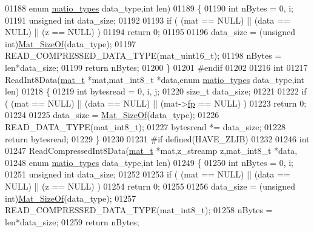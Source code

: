 \begin{DoxyCode}
01188     \textcolor{keyword}{enum} \hyperlink{group___m_a_t_gacf7b3b879282b7ab3a51190e49bf3453}{matio\_types} data\_type,\textcolor{keywordtype}{int} len)
01189 \{
01190     \textcolor{keywordtype}{int} nBytes = 0, i;
01191     \textcolor{keywordtype}{unsigned} \textcolor{keywordtype}{int} data\_size;
01192 
01193     \textcolor{keywordflow}{if} ( (mat == NULL) || (data == NULL) || (z == NULL) )
01194         \textcolor{keywordflow}{return} 0;
01195 
01196     data\_size = (\textcolor{keywordtype}{unsigned} int)\hyperlink{group__mat__util_gab6774aabdc124c540c1e7686d0804940}{Mat\_SizeOf}(data\_type);
01197     READ\_COMPRESSED\_DATA\_TYPE(mat\_uint16\_t);
01198     nBytes = len*data\_size;
01199     \textcolor{keywordflow}{return} nBytes;
01200 \}
01201 \textcolor{preprocessor}{#endif}
01202 
01216 \textcolor{keywordtype}{int}
01217 ReadInt8Data(\hyperlink{struct__mat__t}{mat\_t} *mat,mat\_int8\_t *data,\textcolor{keyword}{enum} \hyperlink{group___m_a_t_gacf7b3b879282b7ab3a51190e49bf3453}{matio\_types} data\_type,\textcolor{keywordtype}{int} len)
01218 \{
01219     \textcolor{keywordtype}{int} bytesread = 0, i, j;
01220     \textcolor{keywordtype}{size\_t} data\_size;
01221 
01222     \textcolor{keywordflow}{if} ( (mat == NULL) || (data == NULL) || (mat->\hyperlink{struct__mat__t_a85f562e407ca9ad4d2a6e14f839432b7}{fp} == NULL) )
01223         \textcolor{keywordflow}{return} 0;
01224 
01225     data\_size = \hyperlink{group__mat__util_gab6774aabdc124c540c1e7686d0804940}{Mat\_SizeOf}(data\_type);
01226     READ\_DATA\_TYPE(mat\_int8\_t);
01227     bytesread *= data\_size;
01228     \textcolor{keywordflow}{return} bytesread;
01229 \}
01230 
01231 \textcolor{preprocessor}{#if defined(HAVE\_ZLIB)}
01232 
01246 \textcolor{keywordtype}{int}
01247 ReadCompressedInt8Data(\hyperlink{struct__mat__t}{mat\_t} *mat,z\_streamp z,mat\_int8\_t *data,
01248     \textcolor{keyword}{enum} \hyperlink{group___m_a_t_gacf7b3b879282b7ab3a51190e49bf3453}{matio\_types} data\_type,\textcolor{keywordtype}{int} len)
01249 \{
01250     \textcolor{keywordtype}{int} nBytes = 0, i;
01251     \textcolor{keywordtype}{unsigned} \textcolor{keywordtype}{int} data\_size;
01252 
01253     \textcolor{keywordflow}{if} ( (mat == NULL) || (data == NULL) || (z == NULL) )
01254         \textcolor{keywordflow}{return} 0;
01255 
01256     data\_size = (\textcolor{keywordtype}{unsigned} int)\hyperlink{group__mat__util_gab6774aabdc124c540c1e7686d0804940}{Mat\_SizeOf}(data\_type);
01257     READ\_COMPRESSED\_DATA\_TYPE(mat\_int8\_t);
01258     nBytes = len*data\_size;
01259     \textcolor{keywordflow}{return} nBytes;

\end{DoxyCode}
